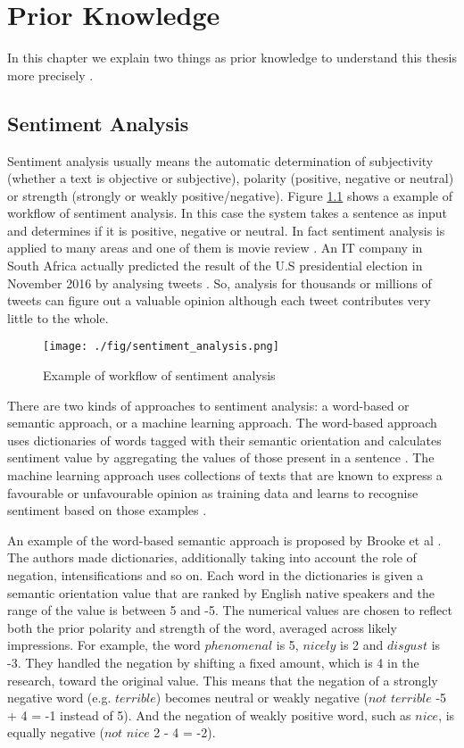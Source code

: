 \chapter{Prior Knowledge}
In this chapter we explain two things as prior knowledge to understand this thesis more precisely .

\section{Sentiment Analysis} \label{sec:sentimen_analysis}
Sentiment analysis usually means the automatic determination of subjectivity (whether a text is objective or subjective), polarity (positive, negative or neutral) or strength (strongly or weakly positive/negative).
Figure \ref{fig:sentiment_analysis} shows a example of workflow of sentiment analysis.
In this case the system takes a sentence as input and determines if it is positive, negative or neutral. 
In fact sentiment analysis is applied to many areas and one of them is movie review \cite{movie_review}.
An IT company in South Africa actually predicted the result of the U.S presidential election in November 2016 by analysing tweets \cite{us_election}.
So, analysis for thousands or millions of tweets can figure out a valuable opinion although each tweet contributes very little to the whole.
\begin{figure}
	\centering
	\texttt{[image: ./fig/sentiment\_analysis.png]}
	\caption{Example of workflow of sentiment analysis}
	\label{fig:sentiment_analysis}
\end{figure}


There are two kinds of approaches to sentiment analysis: a word-based or semantic approach, or a machine learning approach.
The word-based approach uses dictionaries of words tagged with their semantic orientation and calculates sentiment value by aggregating the values of those present in a sentence \cite{Turney}.
The machine learning approach uses collections of texts that are known to express a favourable or unfavourable opinion as training data and learns to recognise sentiment based on those examples \cite{Pang}.

An example of the word-based semantic approach is proposed by Brooke et al \cite{Brooke}.
The authors made dictionaries, additionally taking into account  the role of negation, intensifications and so on.
Each word in the dictionaries is given a semantic orientation value that are ranked by English native speakers and the range of the value is between 5 and -5.
The numerical values are chosen to reflect both the prior polarity and strength of the word, averaged across likely impressions.
For example, the word $phenomenal$ is 5, $nicely$ is 2 and $disgust$ is -3.
They handled the negation by shifting a fixed amount, which is 4 in the research, toward the original value.
This means that the negation of a strongly negative word (e.g. $terrible$) becomes neutral or weakly negative ($not$ $terrible$ -5 + 4 = -1 instead of 5).
And the negation of weakly positive word, such as $nice$, is equally negative ($not$ $nice$ 2 - 4 = -2).

